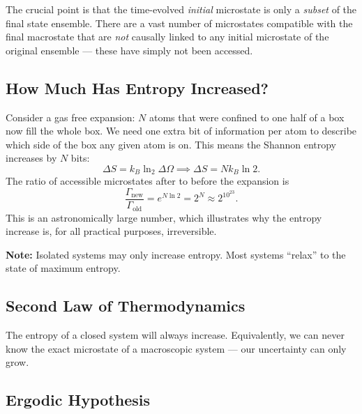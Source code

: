 The crucial point is that the time-evolved \emph{initial} microstate is only a \emph{subset} of the final state ensemble. There are a vast number of microstates compatible with the final macrostate that are \emph{not} causally linked to any initial microstate of the original ensemble — these have simply not been accessed.

\subsection{How Much Has Entropy Increased?}

Consider a gas free expansion: $N$ atoms that were confined to one half of a box now fill the whole box. We need one extra bit of information per atom to describe which side of the box any given atom is on. This means the Shannon entropy increases by $N$ bits:
\begin{equation}
    \Delta S = k_B\ln_2\Delta\Omega \implies \Delta S = Nk_B\ln 2.
\end{equation}
The ratio of accessible microstates after to before the expansion is
\begin{equation}
    \frac{\Gamma_{\text{new}}}{\Gamma_{\text{old}}} = e^{N\ln 2} = 2^N \approx 2^{10^{23}}.
\end{equation}
This is an astronomically large number, which illustrates why the entropy increase is, for all practical purposes, irreversible.

\begin{fact}
\textbf{Note:} Isolated systems may only increase entropy. Most systems ``relax'' to the state of maximum entropy.
\end{fact}


\subsection{Second Law of Thermodynamics}

\begin{theorem}
The entropy of a closed system will always increase. Equivalently, we can never know the exact microstate of a macroscopic system — our uncertainty can only grow.
\end{theorem}

\subsection{Ergodic Hypothesis}

